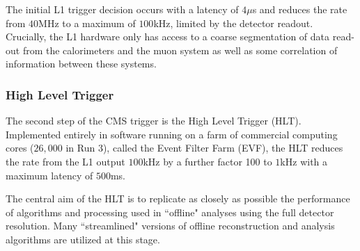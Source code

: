 The initial L1 trigger decision occurs with a latency of $4 \mu$s and reduces the  rate from $40$MHz to a maximum of $100$kHz, limited by the detector readout. 
Crucially, the L1 hardware only has access to a coarse segmentation of data read-out from the calorimeters and the muon system as well as some correlation of information between these systems\cite{fontanesi2022cms}.





\subsubsection{High Level Trigger}

The second step of the CMS trigger is the High Level Trigger (HLT). Implemented entirely in software running on a farm of commercial computing cores ($26,000$ in Run 3), called the Event Filter Farm (EVF), the HLT reduces the rate from the L1 output $100$kHz by a further factor 100 to $1$kHz with a maximum latency of $500$ms\cite{cms2023development,trocino2014cms,donato2018cms}.
\vspace{12pt}

The central aim of the HLT is to replicate as closely as possible the performance of algorithms and processing used in ``offline" analyses using the full detector resolution. Many ``streamlined" versions of offline reconstruction and analysis algorithms are utilized at this stage.
\par

